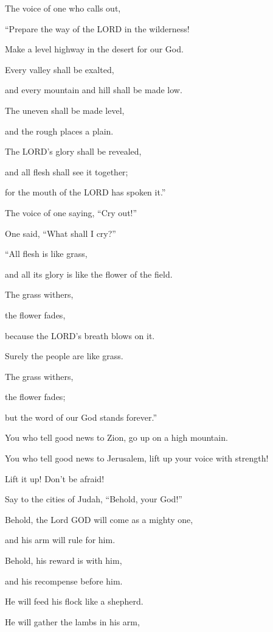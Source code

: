 \myverse{}The voice of one who calls out,

“Prepare the way of the LORD in the wilderness!

Make a level highway in the desert for our God.

\myverse{}Every valley shall be exalted,

and every mountain and hill shall be made low.

The uneven shall be made level,

and the rough places a plain.

\myverse{}The LORD’s glory shall be revealed,

and all flesh shall see it together;

for the mouth of the LORD has spoken it.”


\vspace{\baselineskip} \myverse{}The voice of one saying, “Cry out!”

One said, “What shall I cry?”

“All flesh is like grass,

and all its glory is like the flower of the field.

\myverse{}The grass withers,

the flower fades,

because the LORD’s breath blows on it.

Surely the people are like grass.

\myverse{}The grass withers,

the flower fades;

but the word of our God stands forever.”


\vspace{\baselineskip} \myverse{}You who tell good news to Zion, go up on a high mountain.

You who tell good news to Jerusalem, lift up your voice with strength!

Lift it up! Don’t be afraid!

Say to the cities of Judah, “Behold, your God!”

\myverse{}Behold, the Lord GOD will come as a mighty one,

and his arm will rule for him.

Behold, his reward is with him,

and his recompense before him.

\myverse{}He will feed his flock like a shepherd.

He will gather the lambs in his arm,

